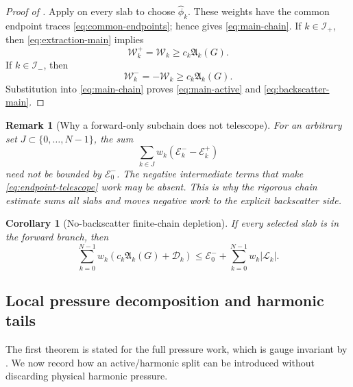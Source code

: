 \documentclass[10pt,a4paper]{amsart}
\numberwithin{equation}{section}
\newtheorem{corollary}[theorem]{Corollary}
\newtheorem{remark}[theorem]{Remark}
\newcommand{\W}{\mathcal W}
\newcommand{\D}{\mathcal D}
\newcommand{\Lk}{\mathcal L}
\newcommand{\Ek}{\mathcal E}
\newcommand{\Aact}{\mathfrak A}
\begin{document}
\begin{proof}[Proof of ]
Apply  on every slab to choose \(\widehat\phi_k\). These weights have the common endpoint traces \eqref{eq:common-endpoints}; hence  gives \eqref{eq:main-chain}. If \(k\in\mathcal I_+\), then \eqref{eq:extraction-main} implies
\[
\W_k^+=\W_k\ge c_k\Aact_k(G).
\]
If \(k\in\mathcal I_-\), then
\[
\W_k^-=-\W_k\ge c_k\Aact_k(G).
\]
Substitution into \eqref{eq:main-chain} proves \eqref{eq:main-active} and \eqref{eq:backscatter-main}.
\end{proof}


\begin{remark}[Why a forward-only subchain does not telescope]\label{rem:subset}
For an arbitrary set \(J\subset\{0,\ldots,N-1\}\), the sum
\[
\sum_{k\in J}w_k(\Ek_k^- -\Ek_k^+)
\]
need not be bounded by \(\Ek_0^-\). The negative intermediate terms that make \eqref{eq:endpoint-telescope} work may be absent. This is why the rigorous chain estimate sums all slabs and moves negative work to the explicit backscatter side.
\end{remark}

\begin{corollary}[No-backscatter finite-chain depletion]\label{cor:no-backscatter}
If every selected slab is in the forward branch, then
\begin{equation}\label{eq:no-backscatter}
\sum_{k=0}^{N-1}w_k
\left(
 c_k\Aact_k(G)+\D_k
\right)
\le
\Ek_0^-
+
\sum_{k=0}^{N-1}w_k|\Lk_k|.
\end{equation}
\end{corollary}

\subsection{Local pressure decomposition and harmonic tails}\label{sec:pressure}

The first theorem is stated for the full pressure work, which is gauge invariant by . We now record how an active/harmonic split can be introduced without discarding physical harmonic pressure.
\end{document}
